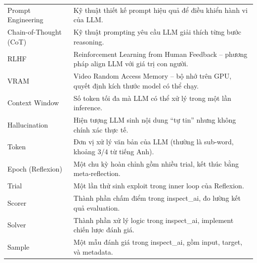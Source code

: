 \documentclass{nt521report}
\begin{document}
\begin{longtable}{l p{10cm}}
  Prompt Engineering & Kỹ thuật thiết kế prompt hiệu quả để điều khiển hành vi của LLM. \\
  Chain-of-Thought (CoT) & Kỹ thuật prompting yêu cầu LLM giải thích từng bước reasoning. \\
  RLHF & Reinforcement Learning from Human Feedback -- phương pháp align LLM với giá trị con người. \\
  VRAM & Video Random Access Memory -- bộ nhớ trên GPU, quyết định kích thước model có thể chạy. \\
  Context Window & Số token tối đa mà LLM có thể xử lý trong một lần inference. \\
  Hallucination & Hiện tượng LLM sinh nội dung ``tự tin'' nhưng không chính xác thực tế. \\
  Token & Đơn vị xử lý văn bản của LLM (thường là sub-word, khoảng 3/4 từ tiếng Anh). \\
  Epoch (Reflexion) & Một chu kỳ hoàn chỉnh gồm nhiều trial, kết thúc bằng meta-reflection. \\
  Trial & Một lần thử sinh exploit trong inner loop của Reflexion. \\
  Scorer & Thành phần chấm điểm trong inspect\_ai, đo lường kết quả evaluation. \\
  Solver & Thành phần xử lý logic trong inspect\_ai, implement chiến lược đánh giá. \\
  Sample & Một mẫu đánh giá trong inspect\_ai, gồm input, target, và metadata. \\
\end{longtable}
\end{document}
